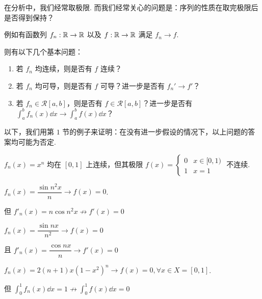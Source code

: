 
在分析中，我们经常取极限. 而我们经常关心的问题是：序列的性质在取完极限后是否得到保持？

例如有函数列 $f_n:\mathbb{R}\to\mathbb{R}$ 以及 $f:\mathbb{R}\to\mathbb{R}$ 满足 $f_n\to f$.

则有以下几个基本问题：

\begin{enumerate}
    \item 若 $f_n$ 均连续，则是否有 $f$ 连续？
    
    \item 若 $f_n$ 均可导，则是否有 $f$ 可导？进一步是否有 $f_n'\to f'$？
    
    \item 若 $f_n\in\mathcal{R}[a,b]$，则是否有 $f\in\mathcal{R}[a,b]$？进一步是否有 $\displaystyle\int_a^bf_n(x)\dd x\to\int_a^bf(x)\dd x$？
\end{enumerate}

以下，我们用第 $1$ 节的例子来证明：在没有进一步假设的情况下，以上问题的答案均可能为否定.

\begin{example}
    $f_n(x)=x^n$ 均在 $[0,1]$ 上连续，但其极限 $f(x)=\begin{cases}
        0 & x\in[0,1)\\
        1 & x=1
    \end{cases}$ 不连续.
\end{example}

\begin{example}
    $f_n(x)=\dfrac{\sin n^2x}{n}\to f(x)=0$.

    \vspace{0.2em}

    但 $f'_n(x)=n\cos n^2x\not\to f'(x)=0$
\end{example}

\begin{example}
    $f_n(x)=\dfrac{\sin nx}{n^2}\to f(x)=0$

    \vspace{0.2em}

    且 $f'_n(x)=\dfrac{\cos nx}{n}\to f'(x)=0$
\end{example}

\begin{example}
    $f_n(x)=2(n+1)x(1-x^2)^n\to f(x)=0,\forall x\in X=[0,1]$.

    \vspace{0.2em}

    但 $\displaystyle\int_0^1f_n(x)\dd x=1\not\to\int_0^1f(x)\dd x=0$
\end{example}


